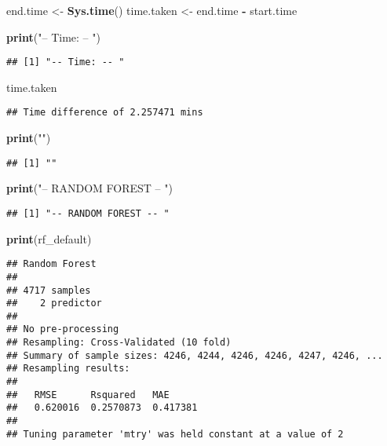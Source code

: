 \documentclass[
]{article}
\newenvironment{Shaded}{\begin{snugshade}}{\end{snugshade}}
\newcommand{\KeywordTok}[1]{\textcolor[rgb]{0.13,0.29,0.53}{\textbf{#1}}}
\newcommand{\NormalTok}[1]{#1}
\newcommand{\OperatorTok}[1]{\textcolor[rgb]{0.81,0.36,0.00}{\textbf{#1}}}
\newcommand{\StringTok}[1]{\textcolor[rgb]{0.31,0.60,0.02}{#1}}
\begin{document}
\begin{Shaded}
\begin{Highlighting}[]
\NormalTok{end.time <-}\StringTok{ }\KeywordTok{Sys.time}\NormalTok{()}
\NormalTok{time.taken <-}\StringTok{ }\NormalTok{end.time }\OperatorTok{-}\StringTok{ }\NormalTok{start.time}

\KeywordTok{print}\NormalTok{(}\StringTok{"-- Time: -- "}\NormalTok{)}
\end{Highlighting}
\end{Shaded}

\begin{verbatim}
## [1] "-- Time: -- "
\end{verbatim}

\begin{Shaded}
\begin{Highlighting}[]
\NormalTok{time.taken}
\end{Highlighting}
\end{Shaded}

\begin{verbatim}
## Time difference of 2.257471 mins
\end{verbatim}

\begin{Shaded}
\begin{Highlighting}[]
\KeywordTok{print}\NormalTok{(}\StringTok{""}\NormalTok{)}
\end{Highlighting}
\end{Shaded}

\begin{verbatim}
## [1] ""
\end{verbatim}

\begin{Shaded}
\begin{Highlighting}[]
\KeywordTok{print}\NormalTok{(}\StringTok{"-- RANDOM FOREST -- "}\NormalTok{)}
\end{Highlighting}
\end{Shaded}

\begin{verbatim}
## [1] "-- RANDOM FOREST -- "
\end{verbatim}

\begin{Shaded}
\begin{Highlighting}[]
\KeywordTok{print}\NormalTok{(rf_default)}
\end{Highlighting}
\end{Shaded}

\begin{verbatim}
## Random Forest 
## 
## 4717 samples
##    2 predictor
## 
## No pre-processing
## Resampling: Cross-Validated (10 fold) 
## Summary of sample sizes: 4246, 4244, 4246, 4246, 4247, 4246, ... 
## Resampling results:
## 
##   RMSE      Rsquared   MAE     
##   0.620016  0.2570873  0.417381
## 
## Tuning parameter 'mtry' was held constant at a value of 2
\end{verbatim}
\end{document}

